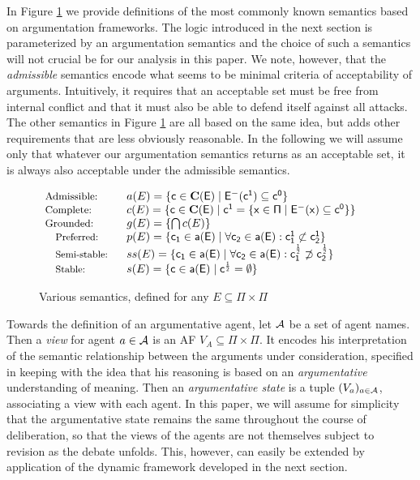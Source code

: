 \documentclass[greybox]{svmult}
\newcommand{\proto}{\mathbf C}
\newcommand{\clab}{\sf c}
\begin{document}
In Figure \ref{fig:sem} we provide definitions of the most commonly known semantics based on argumentation frameworks. The logic introduced in the next section is parameterized by an argumentation semantics and the choice of such a semantics will not crucial be for our analysis in this paper. We note, however, that the \emph{admissible} semantics encode what seems to be minimal criteria of acceptability of arguments. Intuitively, it requires that an acceptable set must be free from internal conflict and that it must also be able to defend itself against all attacks. The other semantics in Figure \ref{fig:sem} are all based on the same idea, but adds other requirements that are less obviously reasonable. In the following we will assume only that whatever our argumentation semantics returns as an acceptable set, it is always also acceptable under the admissible semantics.

\begin{figure}
$\begin{array}{ll}
\text{\footnotesize{Admissible: }} & a(E) = \{\clab \in \proto(E) \mid  E^-(\clab^1) \subseteq \clab^0\} \\
\text{\footnotesize{Complete:}} & c(E) =  \{\clab \in \proto(E) \mid \clab^1 = \{x \in \Pi \mid E^-(x) \subseteq \clab^0\}\} \\
\text{\footnotesize{Grounded:}} & g(E) = \{\bigcap c(E)\} \\
\text{\small{Preferred:}} \ \ & p(E) = \{\clab_1 \in a(E) \mid \forall \clab_2 \in a(E): \clab^1_1 \not \subset \clab^1_2\} \\
\text{\small{Semi-stable:}} \ \ & ss(E) = \{\clab_1 \in a(E) \mid \forall \clab_2 \in a(E): \clab^{\frac{1}{2}}_1 \not \supset \clab^{\frac{1}{2}}_2\} \\
\text{\small{Stable:}} \ \ & s(E) = \{\clab \in a(E) \mid \clab^{\frac{1}{2}} = \emptyset\} 
\end{array}$
\caption{Various semantics, defined for any $E \subseteq \Pi \times \Pi$}
\label{fig:sem}
\end{figure}

Towards the definition of an argumentative agent, let $\mathcal A$ be a set of agent names. Then a \emph{view} for agent $a \in \mathcal A$ is an AF $V_A \subseteq \Pi \times \Pi$. It encodes his interpretation of the semantic relationship between the arguments under consideration, specified in keeping with the idea that his reasoning is based on an \emph{argumentative} understanding of meaning. Then an \emph{argumentative state} is a tuple $(V_a)_{a \in \mathcal A}$, associating a view with each agent. In this paper, we will assume for simplicity that the argumentative state remains the same throughout the course of deliberation, so that the views of the agents are not themselves subject to revision as the debate unfolds. This, however, can easily be extended by application of the dynamic framework developed in the next section.
\end{document}
